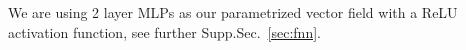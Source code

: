 \documentclass{article}
\theoremstyle{definition} \newtheorem{definition}{Definition}  \newtheorem{example}{Example}
\theoremstyle{remark} \newtheorem{remark}{Remark}
\newcounter{ct}
\begin{document}
We are using 2 layer MLPs as our parametrized vector field with a ReLU activation function, see further Supp.Sec.~\ref{sec:fnn}.



%

\end{document}

